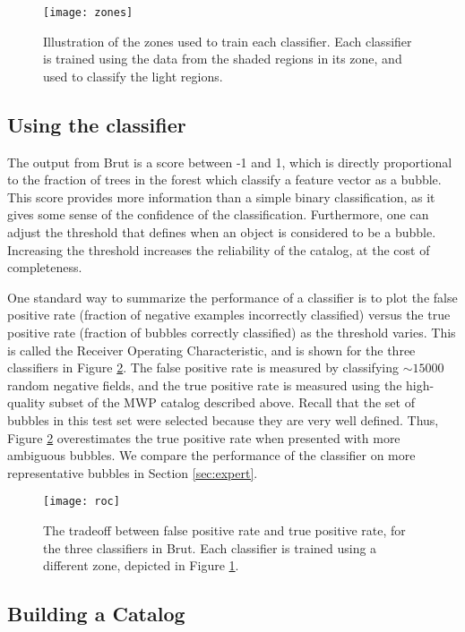 \documentclass[preprint]{aastex}
\begin{document}
\begin{figure}[h!]
\texttt{[image: zones]}
\caption{Illustration of the zones used to train each classifier. Each classifier is trained using the data from the shaded regions in its zone, and used to classify the light regions.}
\label{fig:zone}
\end{figure}

\subsection{Using the classifier}

The output from Brut is a score between -1 and 1, which is directly proportional to the fraction of trees in the forest which classify a feature vector as a bubble. This score provides more information than a simple binary classification, as it gives some sense of the confidence of the classification. Furthermore, one can adjust the threshold that defines when an object is considered to be a bubble. Increasing the threshold increases the reliability of the catalog, at the cost of completeness.

One standard way to summarize the performance of a classifier is to plot the false positive rate (fraction of negative examples incorrectly classified) versus the true positive rate (fraction of bubbles correctly classified) as the threshold varies. This is called the Receiver Operating Characteristic, and is shown for the three classifiers in Figure \ref{fig:roc}. The false positive rate is measured by classifying $\sim 15000$ random negative fields, and the true positive rate is measured using the high-quality subset of the MWP catalog described above. Recall that the set of bubbles in this test set were selected because they are very well defined. Thus, Figure \ref{fig:roc} overestimates the true positive rate when presented with more ambiguous bubbles. We compare the performance of the classifier on more representative bubbles in Section \ref{sec:expert}.

\begin{figure}[h!]
\texttt{[image: roc]}
\caption{The tradeoff between false positive rate and true positive rate, for the three classifiers in Brut. Each classifier is trained using a different zone, depicted in Figure \ref{fig:zone}.}
\label{fig:roc}
\end{figure}


\subsection{Building a Catalog}
\label{sec:build}
\end{document}
